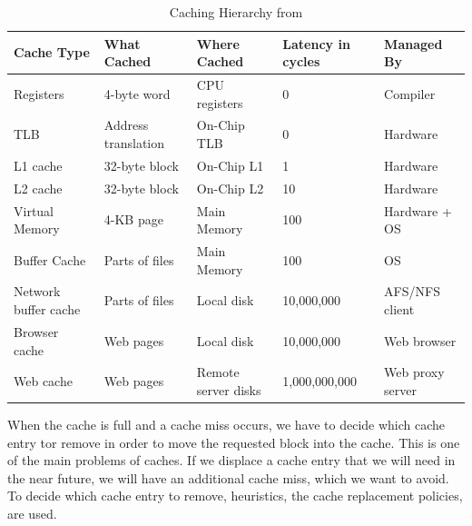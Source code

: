 \documentclass[
	12pt,
	a4paper,
	abstract,
	bibliography=totoc,
	chapterprefix,
	headings=openright,
	numbers=endperiod,
	parskip=half,
	twoside,
]{scrreprt}
\begin{document}
\begin{table}[ht]
	\centering
	\begin{tabular}{|p{3cm}|p{3cm}|p{3cm}|p{2cm}|p{3cm}|}
		\hline
		\textbf{Cache Type} & \textbf{What Cached} & \textbf{Where Cached} & \textbf{Latency in cycles} & \textbf{Managed By}\\
		\hline
		Registers & 4-byte word & CPU registers & 0 & Compiler \\
		\hline
		TLB & Address translation & On-Chip TLB & 0 & Hardware \\
		\hline
		L1 cache & 32-byte block & On-Chip L1 & 1 & Hardware \\
		\hline
		L2 cache & 32-byte block & On-Chip L2 & 10 & Hardware \\
		\hline
		Virtual Memory & 4-KB page & Main Memory & 100 & Hardware + OS \\
		\hline
		Buffer Cache & Parts of files & Main Memory & 100 & OS \\
		\hline
		Network buffer cache & Parts of files & Local disk & 10,000,000 & AFS/NFS client \\
		\hline
		Browser cache & Web pages & Local disk & 10,000,000 & Web browser \\
		\hline
		Web cache & Web pages & Remote server disks & 1,000,000,000 & Web proxy server \\
		\hline
	\end{tabular}
	\caption{Caching Hierarchy from \cite{7569243}}
	\label{tab:caching hierarchy}
\end{table}


When the cache is full and a cache miss occurs, we have to decide which cache entry tor remove in order to move the requested block into the cache.
This is one of the main problems of caches. If we displace a cache entry that we will need in the near future, we will have an additional cache miss, which we want to avoid.
To decide which cache entry to remove, heuristics, the cache replacement policies, are used.
\end{document}
